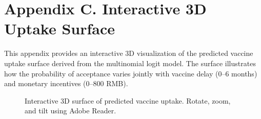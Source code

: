 \documentclass{article}
\begin{document}
\appendix
\section*{Appendix C. Interactive 3D Uptake Surface}

This appendix provides an interactive 3D visualization of the predicted vaccine uptake
surface derived from the multinomial logit model. The surface illustrates how the
probability of acceptance varies jointly with vaccine delay (0--6 months) and monetary
incentives (0--800 RMB).

\begin{figure}[H]
\centering
{}
\caption{Interactive 3D surface of predicted vaccine uptake. Rotate, zoom, and tilt using Adobe Reader.}
\label{fig:3Dsurface}
\end{figure}
\end{document}

